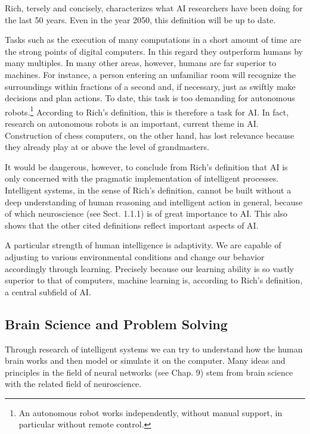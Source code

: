 \documentclass[10pt]{book}
\begin{document}
Rich, tersely and concisely, characterizes what AI researchers have been doing for the last 50 years. Even in the year 2050, this definition will be up to date.

Tasks such as the execution of many computations in a short amount of time are the strong points of digital computers. In this regard they outperform humans by many multiples. In many other areas, however, humans are far superior to machines. For instance, a person entering an unfamiliar room will recognize the surroundings within fractions of a second and, if necessary, just as swiftly make decisions and plan actions. To date, this task is too demanding for autonomous robots.\footnote{An autonomous robot works independently, without manual support, in particular without remote control.} According to Rich's definition, this is therefore a task for AI. In fact, research on autonomous robots is an important, current theme in AI. Construction of chess computers, on the other hand, has lost relevance because they already play at or above the level of grandmasters.

It would be dangerous, however, to conclude from Rich's definition that AI is only concerned with the pragmatic implementation of intelligent processes. Intelligent systems, in the sense of Rich's definition, cannot be built without a deep understanding of human reasoning and intelligent action in general, because of which neuroscience (see Sect. 1.1.1) is of great importance to AI. This also shows that the other cited definitions reflect important aspects of AI.

A particular strength of human intelligence is adaptivity. We are capable of adjusting to various environmental conditions and change our behavior accordingly through learning. Precisely because our learning ability is so vastly superior to that of computers, machine learning is, according to Rich's definition, a central subfield of AI.

\subsection{Brain Science and Problem Solving}
Through research of intelligent systems we can try to understand how the human brain works and then model or simulate it on the computer. Many ideas and principles in the field of neural networks (see Chap. 9) stem from brain science with the related field of neuroscience.
\end{document}
